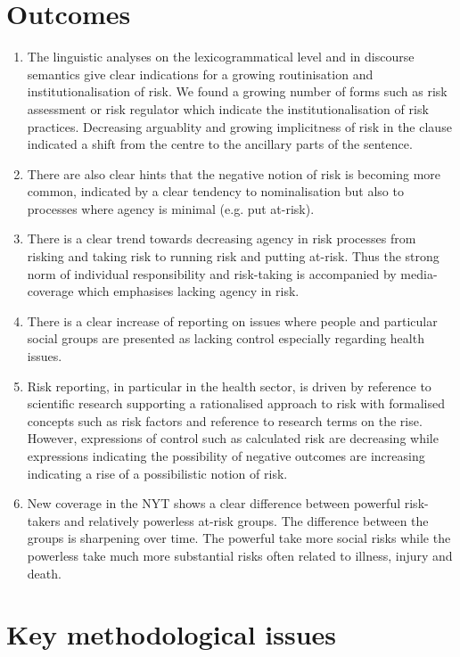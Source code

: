 \documentclass{report}
\begin{document}
\section{Outcomes}

\begin{enumerate}
\item The linguistic analyses on the lexicogrammatical level and in discourse semantics give clear indications for a growing routinisation and institutionalisation of risk. We found a growing number of forms such as risk assessment or risk regulator which indicate the institutionalisation of risk practices. Decreasing arguablity and growing implicitness of risk in the clause indicated a shift from the centre to the ancillary parts of the sentence.
\item There are also clear hints that the negative notion of risk is becoming more common, indicated by a clear tendency to nominalisation but also to processes where agency is minimal (e.g. put at-risk).
\item There is a clear trend towards decreasing agency in risk processes from risking and taking risk to running risk and putting at-risk. Thus the strong norm of individual responsibility and risk-taking is accompanied by media-coverage which emphasises lacking agency in risk.
\item There is a clear increase of reporting on issues where people and particular social groups are presented as lacking control especially regarding health issues.
\item Risk reporting, in particular in the health sector, is driven by reference to scientific research supporting a rationalised approach to risk with formalised concepts such as risk factors and reference to research terms on the rise. However, expressions of control such as calculated risk are decreasing while expressions indicating the possibility of negative outcomes are increasing indicating a rise of a possibilistic notion of risk.
\item New coverage in the NYT shows a clear difference between powerful risk-takers and relatively powerless at-risk groups. The difference between the groups is sharpening over time. The powerful take more social risks while the powerless take much more substantial risks often related to illness, injury and death.
\end{enumerate}

\section{Key methodological issues}
\end{document}
